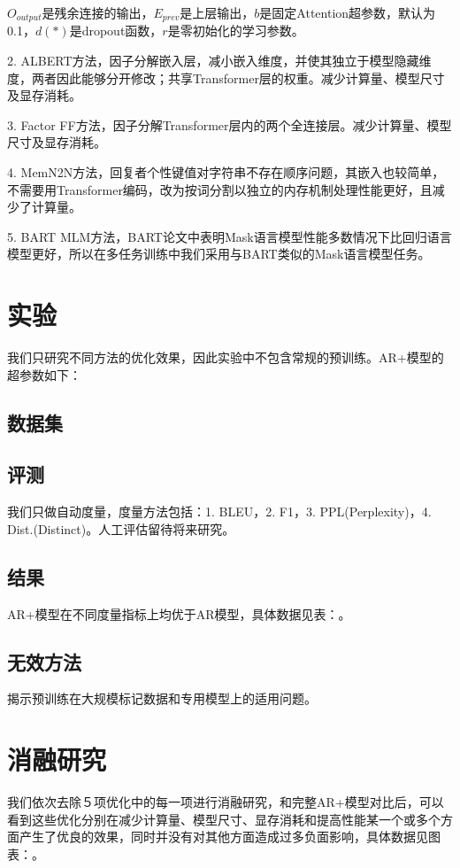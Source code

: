 \documentclass[letterpaper]{article} %
\DeclareRobustCommand{\citeext}[1]{\cite[#1]{#1}}
\begin{document}
\begin{CJK*}{UTF8}{gbsn}
$O_{output}$是残余连接的输出，$E_{prev}$是上层输出，$b$是固定Attention超参数，默认为0.1，$d(*)$是dropout函数，$r$是零初始化的学习参数。

2. ALBERT\citeext{Lan2019}方法，因子分解嵌入层，减小嵌入维度，并使其独立于模型隐藏维度，两者因此能够分开修改；共享Transformer层的权重。减少计算量、模型尺寸及显存消耗。

3. Factor FF方法，因子分解Transformer层内的两个全连接层。减少计算量、模型尺寸及显存消耗。

4. MemN2N\citeext{Sukhbaatar2015}方法，回复者个性键值对字符串不存在顺序问题，其嵌入也较简单，不需要用Transformer编码，改为按词分割以独立的内存机制处理性能更好，且减少了计算量。

5. BART MLM\citeext{Lewis2019}方法，BART论文中表明Mask语言模型性能多数情况下比回归语言模型更好，所以在多任务训练中我们采用与BART类似的Mask语言模型任务。


\section[Experiments]{实验} 
我们只研究不同方法的优化效果，因此实验中不包含常规的预训练。AR+模型的超参数如下：

\subsection[Datasets]{数据集} 


\subsection[Evaluation]{评测} 
我们只做自动度量，度量方法包括：1. BLEU\citeext{Papineni2002}，2. F1，3. PPL(Perplexity)，4. Dist.(Distinct)\citeext{Li2016}。人工评估留待将来研究。


\subsection[Result]{结果} 
AR+模型在不同度量指标上均优于AR模型，具体数据见表：。


\subsection[Ineffective Methods]{无效方法} 

揭示预训练在大规模标记数据和专用模型上的适用问题。

\section[Ablation Study]{消融研究} 
我们依次去除５项优化中的每一项进行消融研究，和完整AR+模型对比后，可以看到这些优化分别在减少计算量、模型尺寸、显存消耗和提高性能某一个或多个方面产生了优良的效果，同时并没有对其他方面造成过多负面影响，具体数据见图表：。


\end{CJK*}
\end{document}

